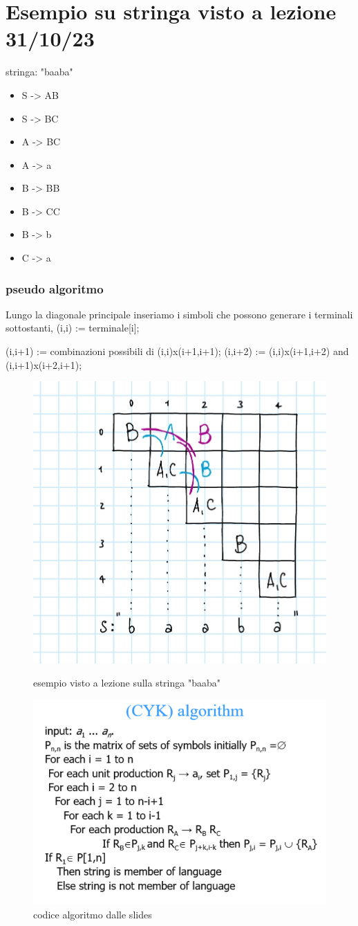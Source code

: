 \section{Esempio su stringa visto a lezione 31/10/23}

    stringa: "baaba"

        \begin{itemize}
            \item{S -> AB}
            \item{S -> BC}
            \item{A -> BC}
            \item{A -> a}
            \item{B -> BB}
            \item{B -> CC}
            \item{B -> b}
            \item{C -> a}
        \end{itemize}

    \subsubsection{pseudo algoritmo}
    Lungo la diagonale principale inseriamo i simboli che possono generare i terminali sottostanti, (i,i) := terminale[i];
    
    (i,i+1) := combinazioni possibili di (i,i)x(i+1,i+1);
    (i,i+2) := (i,i)x(i+1,i+2) and (i,i+1)x(i+2,i+1);

    
    \begin{figure}
        \centering
        \includegraphics[width=0.5\linewidth]{20231130_165150.jpg}
        \caption{esempio visto a lezione sulla stringa "baaba"}
        \label{fig:enter-label}
        \centering
        \includegraphics[width=0.5\linewidth]{cyk.PNG}
        \caption{codice algoritmo dalle slides}
        \label{fig:enter-label}
    \end{figure}
    

